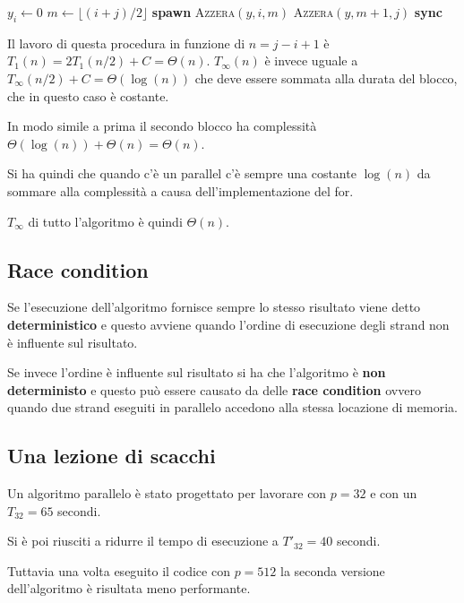 \begin{breakablealgorithm}
\begin{algorithmic}[1]
    \State $y_i \gets 0$
\Else 
    \State $m \gets \lfloor (i+j)/2\rfloor$
    \State \textbf{spawn} \textsc{Azzera}$(y,i,m)$
    \State \textsc{Azzera}$(y,m+1,j)$
    \State \textbf{sync}
\EndIf
\EndFunction
\end{algorithmic}
\end{breakablealgorithm}

Il lavoro di questa procedura in funzione di $n = j-i+1$ è $T_1(n)= 2T_1(n/2)+ C = \Theta(n)$. $T_\infty(n)$ è invece uguale a $T_\infty(n/2)+C = \Theta(\log(n))$ che deve essere sommata alla durata del blocco, che in questo caso è costante.

In modo simile a prima il secondo blocco ha complessità $\Theta(\log(n)) +\Theta(n) = \Theta(n)$.

Si ha quindi che quando c'è un parallel c'è sempre una costante $\log(n)$ da sommare alla complessità a causa dell'implementazione del for.

$T_\infty$ di tutto l'algoritmo è quindi $\Theta(n)$.

\subsection{Race condition}\label{race-condition}

Se l'esecuzione dell'algoritmo fornisce sempre lo stesso risultato viene detto \textbf{deterministico} e questo avviene quando l'ordine di esecuzione degli strand non è influente sul risultato.

Se invece l'ordine è influente sul risultato si ha che l'algoritmo è \textbf{non deterministo} e questo può essere causato da delle \textbf{race condition} ovvero quando due strand eseguiti in parallelo accedono alla stessa locazione di memoria.

\subsection{Una lezione di scacchi}\label{una-lezione-di-scacchi}

Un algoritmo parallelo è stato progettato per lavorare con $p = 32$ e con
un $T_{32} = 65 $ secondi.

Si è poi riusciti a ridurre il tempo di esecuzione a $T'_{32} = 40$ secondi.

Tuttavia una volta eseguito il codice con $p = 512$ la seconda versione dell'algoritmo è risultata meno performante.

